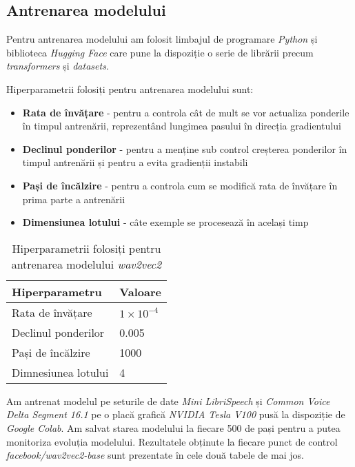 \subsection{Antrenarea modelului}
Pentru antrenarea modelului am folosit limbajul de programare \textit{Python} și biblioteca \textit{Hugging Face}
care pune la dispoziție o serie de librării precum \textit{transformers} și \textit{datasets}.
\par
Hiperparametrii folosiți pentru antrenarea modelului sunt:
\begin{itemize}
    \item \textbf{Rata de învățare} - pentru a controla cât de mult se vor actualiza ponderile în timpul
    antrenării, reprezentând lungimea pasului în direcția gradientului
    \item \textbf{Declinul ponderilor} - pentru a menține sub control creșterea ponderilor în timpul antrenării
    și pentru a evita gradienții instabili
    \item \textbf{Pași de încălzire} - pentru a controla cum se modifică rata de învățare în prima parte 
    a antrenării
    \item \textbf{Dimensiunea lotului} - câte exemple se procesează în același timp
\end{itemize}

\vspace{0.5em}

\begin{table}[h]
    \centering
    \caption{Hiperparametrii folosiți pentru antrenarea modelului \textit{wav2vec2}}
    \label{tab:wav2vec2-hyperparameters}
    \begin{tabular}{@{}lp{2cm}@{}} %
    \toprule %
    \textbf{Hiperparametru} & \textbf{Valoare} \\
    \midrule %
    Rata de învățare & $1 \times 10^{-4}$ \\
    Declinul ponderilor & 0.005 \\
    Pași de încălzire & 1000 \\
    Dimnesiunea lotului & 4 \\
    \bottomrule %
    \end{tabular}
\end{table}

\par
Am antrenat modelul pe seturile de date \textit{Mini LibriSpeech} și \textit{Common Voice Delta Segment 16.1}
pe o placă grafică \textit{NVIDIA Tesla V100} pusă la dispoziție de \textit{Google Colab}. Am salvat starea modelului
la fiecare 500 de pași pentru a putea monitoriza evoluția modelului. Rezultatele obținute la fiecare punct de control
\textit{facebook/wav2vec2-base} sunt prezentate în cele două tabele de mai jos.



